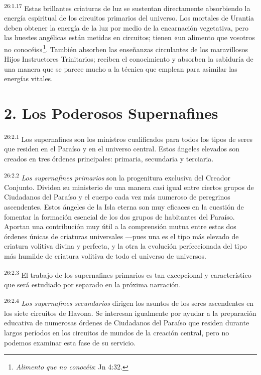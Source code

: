 \par
\textsuperscript{26:1.17} Estas brillantes criaturas de luz se sustentan directamente absorbiendo la energía espiritual de los circuitos primarios del universo. Los mortales de Urantia deben obtener la energía de la luz por medio de la encarnación vegetativa, pero las huestes angélicas están metidas en circuitos; tienen «un alimento que vosotros no conocéis»\footnote{\textit{Alimento que no conocéis}: Jn 4:32.}. También absorben las enseñanzas circulantes de los maravillosos Hijos Instructores Trinitarios; reciben el conocimiento y absorben la sabiduría de una manera que se parece mucho a la técnica que emplean para asimilar las energías vitales.

\section*{2. Los Poderosos Supernafines}
\par
\textsuperscript{26:2.1} Los supernafines son los ministros cualificados para todos los tipos de seres que residen en el Paraíso y en el universo central. Estos ángeles elevados son creados en tres órdenes principales: primaria, secundaria y terciaria.

\par
\textsuperscript{26:2.2} \textit{Los supernafines primarios} son la progenitura exclusiva del Creador Conjunto. Dividen su ministerio de una manera casi igual entre ciertos grupos de Ciudadanos del Paraíso y el cuerpo cada vez más numeroso de peregrinos ascendentes. Estos ángeles de la Isla eterna son muy eficaces en la cuestión de fomentar la formación esencial de los dos grupos de habitantes del Paraíso. Aportan una contribución muy útil a la comprensión mutua entre estas dos órdenes únicas de criaturas universales ---pues una es el tipo más elevado de criatura volitiva divina y perfecta, y la otra la evolución perfeccionada del tipo más humilde de criatura volitiva de todo el universo de universos.

\par
\textsuperscript{26:2.3} El trabajo de los supernafines primarios es tan excepcional y característico que será estudiado por separado en la próxima narración.

\par
\textsuperscript{26:2.4} \textit{Los supernafines secundarios} dirigen los asuntos de los seres ascendentes en los siete circuitos de Havona. Se interesan igualmente por ayudar a la preparación educativa de numerosas órdenes de Ciudadanos del Paraíso que residen durante largos períodos en los circuitos de mundos de la creación central, pero no podemos examinar esta fase de su servicio.

